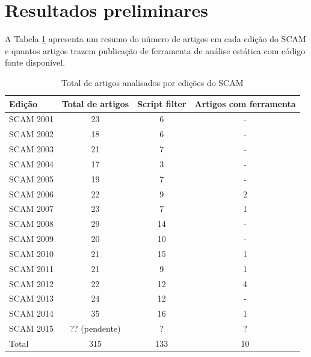 \documentclass[qual, classic, a4paper]{ufbathesis}
\begin{document}
\section{Resultados preliminares}\label{resultados}

A Tabela \ref{artigos-do-scam} apresenta um resumo do número de artigos em
cada edição do SCAM e quantos artigos trazem publicação de ferramenta de análise
estática com código fonte disponível.

\begin{table}
\caption{Total de artigos analisados por edições do SCAM}
\centering
\begin{tabular}{| l | c | c | c |}
\hline
Edição    & Total de artigos & Script filter & Artigos com ferramenta \\
\hline
SCAM 2001 & 23               & 6             & -                      \\
SCAM 2002 & 18               & 6             & -                      \\
SCAM 2003 & 21               & 7             & -                      \\
SCAM 2004 & 17               & 3             & -                      \\
SCAM 2005 & 19               & 7             & -                      \\
SCAM 2006 & 22               & 9             & 2                      \\
SCAM 2007 & 23               & 7             & 1                      \\
SCAM 2008 & 29               & 14            & -                      \\
SCAM 2009 & 20               & 10            & -                      \\
SCAM 2010 & 21               & 15            & 1                      \\
SCAM 2011 & 21               & 9             & 1                      \\
SCAM 2012 & 22               & 12            & 4                      \\
SCAM 2013 & 24               & 12            & -                      \\
SCAM 2014 & 35               & 16            & 1                      \\
SCAM 2015 & ?? (pendente)    & ?             & ?                      \\
\hline
Total     & 315              & 133           & 10                     \\
\hline
\end{tabular}
\label{artigos-do-scam}
\end{table}
\end{document}
